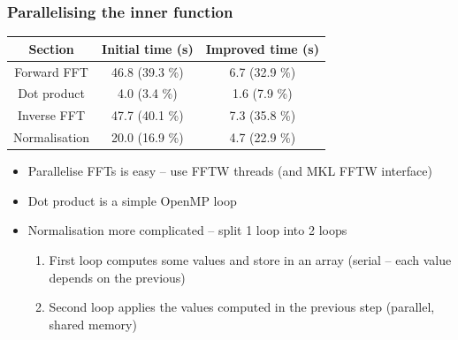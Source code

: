 \documentclass[aspectratio=169]{beamer}
\begin{document}
\begin{frame}[t]
    \frametitle{Parallelising the inner function}
    
    \begin{table}[]
        \centering
        \begin{tabular}{c|c<{\onslide<2->}|c<{\onslide}}
            Section & Initial time (s) & Improved time (s) \\ \hline
            Forward FFT & 46.8 (39.3 \%) & 6.7 (32.9 \%) \\
            Dot product & 4.0 (3.4 \%) & 1.6 (7.9 \%) \\
            Inverse FFT & 47.7 (40.1 \%) & 7.3 (35.8 \%) \\
            Normalisation & 20.0 (16.9 \%) & 4.7 (22.9 \%)
        \end{tabular}
    \end{table}
    
    \begin{itemize}
        \item Parallelise FFTs is easy -- use FFTW threads (and MKL FFTW interface)
        \item Dot product is a simple OpenMP loop
        \item Normalisation more complicated -- split 1 loop into 2 loops
            \begin{enumerate}
                \item First loop computes some values and store in an array (serial -- each value depends on the previous)
                \item Second loop applies the values computed in the previous step (parallel, shared memory)
            \end{enumerate}
    \end{itemize}
    

\end{frame}
\end{document}
